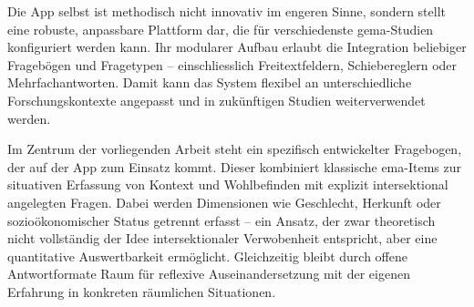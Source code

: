 Die App selbst ist methodisch nicht innovativ im engeren Sinne, sondern stellt eine robuste, anpassbare Plattform dar, die für verschiedenste \acrshort{gema}-Studien konfiguriert werden kann. Ihr modularer Aufbau erlaubt die Integration beliebiger Fragebögen und Fragetypen – einschliesslich Freitextfeldern, Schiebereglern oder Mehrfachantworten. Damit kann das System flexibel an unterschiedliche Forschungskontexte angepasst und in zukünftigen Studien weiterverwendet werden.

Im Zentrum der vorliegenden Arbeit steht ein spezifisch entwickelter Fragebogen, der auf der App zum Einsatz kommt. Dieser kombiniert klassische \gls{ema}-Items zur situativen Erfassung von Kontext und Wohlbefinden mit explizit intersektional angelegten Fragen. Dabei werden Dimensionen wie Geschlecht, Herkunft oder sozioökonomischer Status getrennt erfasst – ein Ansatz, der zwar theoretisch nicht vollständig der Idee intersektionaler Verwobenheit entspricht, aber eine quantitative Auswertbarkeit ermöglicht. Gleichzeitig bleibt durch offene Antwortformate Raum für reflexive Auseinandersetzung mit der eigenen Erfahrung in konkreten räumlichen Situationen.

